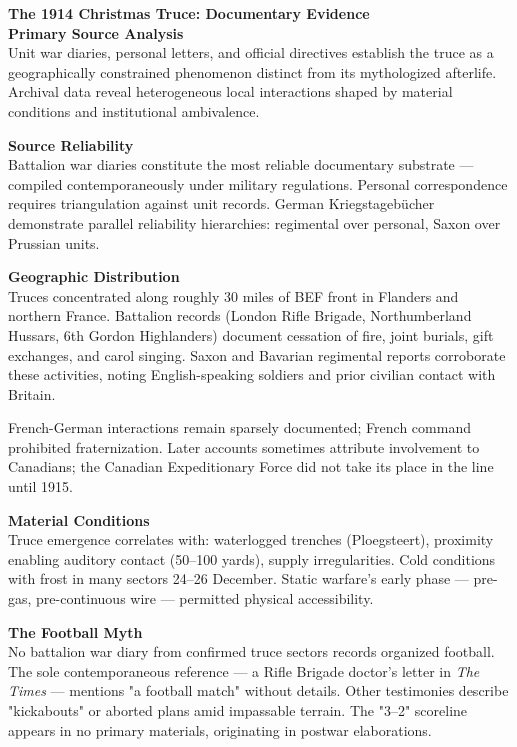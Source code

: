 \begin{technical}
{\Large\textbf{The 1914 Christmas Truce: Documentary Evidence}}\\[0.3em]

\noindent\textbf{Primary Source Analysis}\\[0.5em]
Unit war diaries, personal letters, and official directives establish the truce as a geographically constrained phenomenon distinct from its mythologized afterlife. Archival data reveal heterogeneous local interactions shaped by material conditions and institutional ambivalence.

\noindent\textbf{Source Reliability}\\[0.5em]
Battalion war diaries constitute the most reliable documentary substrate — compiled contemporaneously under military regulations. Personal correspondence requires triangulation against unit records. German Kriegstagebücher demonstrate parallel reliability hierarchies: regimental over personal, Saxon over Prussian units.

\noindent\textbf{Geographic Distribution}\\[0.5em]
Truces concentrated along roughly 30 miles of BEF front in Flanders and northern France. Battalion records (London Rifle Brigade, Northumberland Hussars, 6th Gordon Highlanders) document cessation of fire, joint burials, gift exchanges, and carol singing. Saxon and Bavarian regimental reports corroborate these activities, noting English-speaking soldiers and prior civilian contact with Britain.

French-German interactions remain sparsely documented; French command prohibited fraternization. Later accounts sometimes attribute involvement to Canadians; the Canadian Expeditionary Force did not take its place in the line until 1915.

\noindent\textbf{Material Conditions}\\[0.5em]
Truce emergence correlates with: waterlogged trenches (Ploegsteert), proximity enabling auditory contact (50–100 yards), supply irregularities. Cold conditions with frost in many sectors 24–26 December. Static warfare's early phase — pre-gas, pre-continuous wire — permitted physical accessibility.

\noindent\textbf{The Football Myth}\\[0.5em]
No battalion war diary from confirmed truce sectors records organized football. The sole contemporaneous reference — a Rifle Brigade doctor's letter in \textit{The Times} — mentions "a football match" without details. Other testimonies describe "kickabouts" or aborted plans amid impassable terrain. The "3–2" scoreline appears in no primary materials, originating in postwar elaborations. 


\end{technical}
